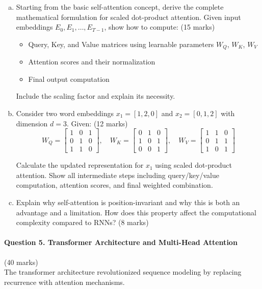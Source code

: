 \documentclass[12pt]{article}
\newcommand{\mediumanswer}{\vspace{3cm}}         %
\newcommand{\journalspace}{\vspace{4.5cm}}       %
\begin{document}
\begin{enumerate}[(a)]
    \item Starting from the basic self-attention concept, derive the complete mathematical formulation for scaled dot-product attention. Given input embeddings $E_0, E_1, \ldots, E_{T-1}$, show how to compute: \hfill (15 marks)
    \begin{itemize}
        \item Query, Key, and Value matrices using learnable parameters $W_Q$, $W_K$, $W_V$
        \item Attention scores and their normalization
        \item Final output computation
    \end{itemize}
    Include the scaling factor and explain its necessity.
    
    \journalspace
    
    \item Consider two word embeddings $x_1 = [1, 2, 0]$ and $x_2 = [0, 1, 2]$ with dimension $d=3$. Given: \hfill (12 marks)
    $$W_Q = \begin{bmatrix} 1 & 0 & 1 \\ 0 & 1 & 0 \\ 1 & 1 & 0 \end{bmatrix}, \quad W_K = \begin{bmatrix} 0 & 1 & 0 \\ 1 & 0 & 1 \\ 0 & 0 & 1 \end{bmatrix}, \quad W_V = \begin{bmatrix} 1 & 1 & 0 \\ 0 & 1 & 1 \\ 1 & 0 & 1 \end{bmatrix}$$
    
    Calculate the updated representation for $x_1$ using scaled dot-product attention. Show all intermediate steps including query/key/value computation, attention scores, and final weighted combination.
    
    \journalspace
    
    \item Explain why self-attention is position-invariant and why this is both an advantage and a limitation. How does this property affect the computational complexity compared to RNNs? \hfill (8 marks)
    
    \mediumanswer
\end{enumerate}

\newpage
\paragraph{Question 5. Transformer Architecture and Multi-Head Attention}\hfill (40 marks)\\
The transformer architecture revolutionized sequence modeling by replacing recurrence with attention mechanisms.
\end{document}

